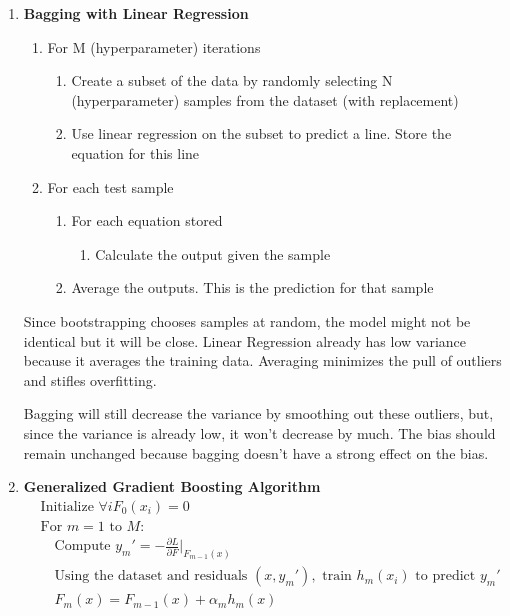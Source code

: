 \documentclass{article}
\begin{document}
\begin{enumerate}
        \item[2.]
            \textbf{Bagging with Linear Regression}
            \begin{enumerate}
                \item[1)] For M (hyperparameter) iterations
                \begin{enumerate}
                    \item Create a subset of the data by randomly selecting N (hyperparameter) samples from the dataset (with replacement)
                    \item Use linear regression on the subset to predict a line. Store the equation for this line
                \end{enumerate}
                \item[2)] For each test sample
                \begin{enumerate}
                    \item For each equation stored
                    \begin{enumerate}
                        \item[a.] Calculate the output given the sample 
                    \end{enumerate}
                    \item Average the outputs. This is the prediction for that sample
                \end{enumerate}
            \end{enumerate}

            Since bootstrapping chooses samples at random, the model might not be identical but it will be close. Linear Regression already has low variance because it averages the training data. Averaging minimizes the pull of outliers and stifles overfitting.
            
            Bagging will still decrease the variance by smoothing out these outliers, but, since the variance is already low, it won't decrease by much. The bias should remain unchanged because bagging doesn't have a strong effect on the bias.

        \item[3.]
            \textbf{Generalized Gradient Boosting Algorithm}
            \[
                \begin{aligned}
                    & \text{Initialize } \forall i F_0(x_i) = 0 \\
                    & \text{For } m = 1 \text{ to } M: \\
                    & \quad \text{Compute } y_m' = -\frac{\partial L}{\partial F} \Big|_{F_{m-1}(x)} \\
                    & \quad \text{Using the dataset and residuals } (x, y_m'), \text{ train } h_m(x_i) \text{ to predict } y_m' \\
                    & \quad F_m(x) = F_{m-1}(x) + \alpha_m h_m(x)
                \end{aligned}
            \]
            

\end{enumerate}
\end{document}
